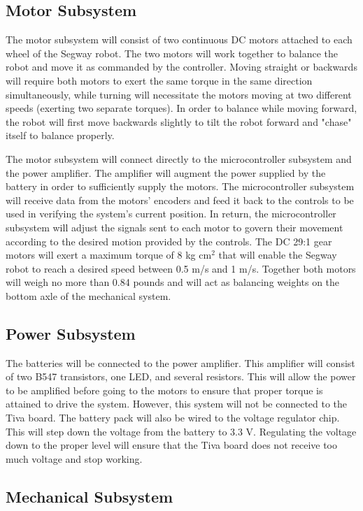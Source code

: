 \documentclass[11pt]{report}
\begin{document}
\begin{spacing}{1.5}
\subsection*{Motor Subsystem}

The motor subsystem will consist of two continuous DC motors attached to each wheel of the Segway robot. The two motors will work together to balance the robot and move it as commanded by the controller. Moving straight or backwards will require both motors to exert the same torque in the same direction simultaneously, while turning will necessitate the motors moving at two different speeds (exerting two separate torques).  In order to balance while moving forward, the robot will first move backwards slightly to tilt the robot forward and "chase" itself to balance properly.

The motor subsystem will connect directly to the microcontroller subsystem and the power amplifier. The amplifier will augment the power supplied by the battery in order to sufficiently supply the motors. The microcontroller subsystem will receive data from the motors’ encoders and feed it back to the controls to be used in verifying the system’s current position. In return, the microcontroller subsystem will adjust the signals sent to each motor to govern their movement according to the desired motion provided by the controls. The DC 29:1 gear motors will exert a maximum torque of 8 kg cm$^2$ that will enable the Segway robot to reach a desired speed between 0.5 m/s and 1 m/s.  Together both motors will weigh no more than 0.84 pounds and will act as balancing weights on the bottom axle of the mechanical system.

\subsection*{Power Subsystem}

The batteries will be connected to the power amplifier. This amplifier will consist of two B547 transistors, one LED, and several resistors. This will allow the power to be amplified before going to the motors to ensure that proper torque is attained to drive the system. However, this system will not be connected to the Tiva board. The battery pack will also be wired to the voltage regulator chip. This will step down the voltage from the battery to 3.3 V. Regulating the voltage down to the proper level will ensure that the Tiva board does not receive too much voltage and stop working.

\subsection*{Mechanical Subsystem}


\end{spacing}
\end{document}
